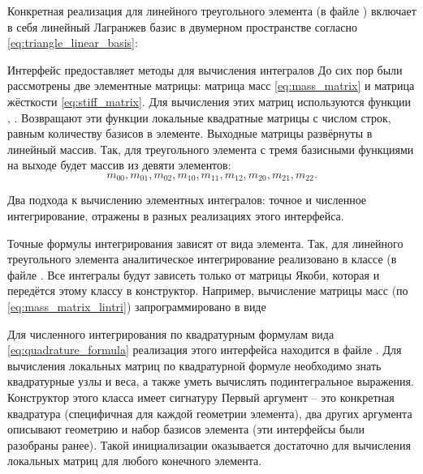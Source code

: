 Конкретная реализация для линейного треугольного элемента 
(в файле )
включает в себя линейный Лагранжев базис в двумерном пространстве согласно
\cref{eq:triangle_linear_basis}:


Интерфейс  предоставляет методы
для вычисления интегралов
До сих пор были рассмотрены две элементные матрицы: матрица масс \cref{eq:mass_matrix} и матрица жёсткости \cref{eq:stiff_matrix}.
Для вычисления этих матриц используются функции , .
Возвращают эти функции локальные квадратные матрицы с числом строк,
равным количеству базисов в элементе. 
Выходные матрицы развёрнуты в линейный массив. Так, для треугольного элемента
с тремя базисными функциями на выходе будет массив из девяти элементов:
$$
m_{00}, m_{01}, m_{02}, m_{10}, m_{11}, m_{12}, m_{20}, m_{21}, m_{22}.
$$

Два подхода к вычислению элементных интегралов: точное и численное интегрирование,
отражены в разных реализациях этого интерфейса.

Точные формулы интегрирования зависят
от вида элемента. Так, для линейного треугольного элемента
аналитическое интегрирование реализовано в классе
 (в файле .
Все интегралы будут зависеть только от матрицы Якоби, которая и передётся этому классу в конструктор.
Например, вычисление матрицы масс (по \cref{eq:mass_matrix_lintri}) запрограммировано в виде

Для численного интегрирования по квадратурным формулам вида \cref{eq:quadrature_formula}
реализация этого интерфейса  находится в файле
.
Для вычисления локальных матриц по квадратурной формуле необходимо
знать квадратурные узлы и веса, а также
уметь вычислять подинтегральное выражения.
Конструктор этого класса имеет сигнатуру
Первый аргумент -- это конкретная квадратура (специфичная для каждой геометрии элемента),
два других аргумента описывают геометрию и набор базисов элемента (эти интерфейсы были разобраны ранее).
Такой инициализации оказывается достаточно для вычисления локальных матриц
для любого конечного элемента.

